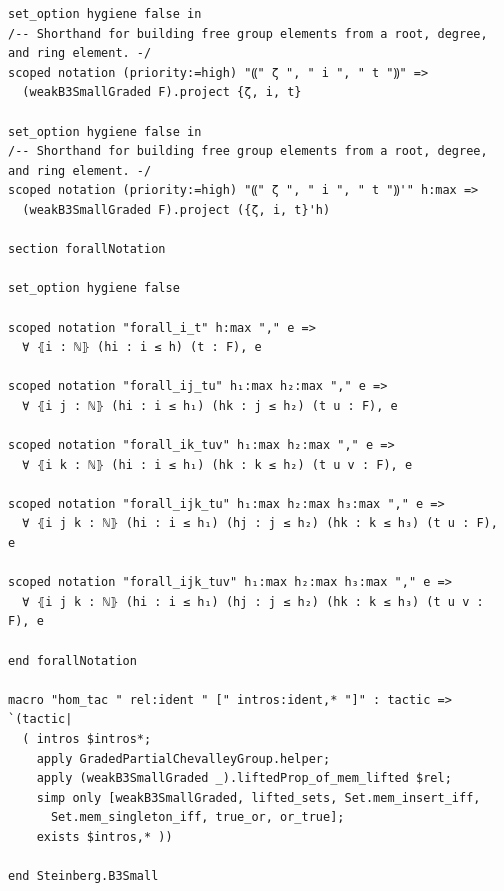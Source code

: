 \begin{Verbatim}
set_option hygiene false in
/-- Shorthand for building free group elements from a root, degree, and ring element. -/
scoped notation (priority:=high) "⸨" ζ ", " i ", " t "⸩" =>
  (weakB3SmallGraded F).project {ζ, i, t}

set_option hygiene false in
/-- Shorthand for building free group elements from a root, degree, and ring element. -/
scoped notation (priority:=high) "⸨" ζ ", " i ", " t "⸩'" h:max =>
  (weakB3SmallGraded F).project ({ζ, i, t}'h)

section forallNotation

set_option hygiene false

scoped notation "forall_i_t" h:max "," e =>
  ∀ ⦃i : ℕ⦄ (hi : i ≤ h) (t : F), e

scoped notation "forall_ij_tu" h₁:max h₂:max "," e =>
  ∀ ⦃i j : ℕ⦄ (hi : i ≤ h₁) (hk : j ≤ h₂) (t u : F), e

scoped notation "forall_ik_tuv" h₁:max h₂:max "," e =>
  ∀ ⦃i k : ℕ⦄ (hi : i ≤ h₁) (hk : k ≤ h₂) (t u v : F), e

scoped notation "forall_ijk_tu" h₁:max h₂:max h₃:max "," e =>
  ∀ ⦃i j k : ℕ⦄ (hi : i ≤ h₁) (hj : j ≤ h₂) (hk : k ≤ h₃) (t u : F), e

scoped notation "forall_ijk_tuv" h₁:max h₂:max h₃:max "," e =>
  ∀ ⦃i j k : ℕ⦄ (hi : i ≤ h₁) (hj : j ≤ h₂) (hk : k ≤ h₃) (t u v : F), e

end forallNotation

macro "hom_tac " rel:ident " [" intros:ident,* "]" : tactic => `(tactic|
  ( intros $intros*;
    apply GradedPartialChevalleyGroup.helper;
    apply (weakB3SmallGraded _).liftedProp_of_mem_lifted $rel;
    simp only [weakB3SmallGraded, lifted_sets, Set.mem_insert_iff,
      Set.mem_singleton_iff, true_or, or_true];
    exists $intros,* ))

end Steinberg.B3Small
\end{Verbatim}
